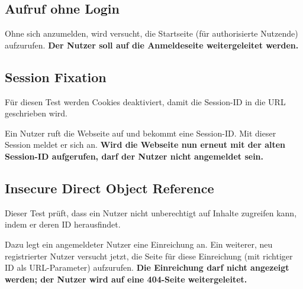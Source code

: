 \subsection{Aufruf ohne Login}\label{subsec:unauthorized-test}
Ohne sich anzumelden, wird versucht, die Startseite (für authorisierte Nutzende) aufzurufen.
\textbf{Der Nutzer soll auf die Anmeldeseite weitergeleitet werden.}

\subsection{Session Fixation}\label{subsec:session-fixation-test}
Für diesen Test werden Cookies deaktiviert, damit die Session-ID in die URL geschrieben wird.

Ein Nutzer ruft die Webseite auf und bekommt eine Session-ID\@.
Mit dieser Session meldet er sich an.
\textbf{Wird die Webseite nun erneut mit der alten Session-ID aufgerufen, darf der Nutzer nicht angemeldet sein.}

\subsection{Insecure Direct Object Reference}\label{subsec:idor-test}
Dieser Test prüft, dass ein Nutzer nicht unberechtigt auf Inhalte zugreifen kann, indem er deren ID herausfindet.

Dazu legt ein angemeldeter Nutzer eine Einreichung an.
Ein weiterer, neu registrierter Nutzer versucht jetzt,
die Seite für diese Einreichung (mit richtiger ID als URL-Parameter) aufzurufen.
\textbf{Die Einreichung darf nicht angezeigt werden; der Nutzer wird auf eine 404-Seite weitergeleitet.}
